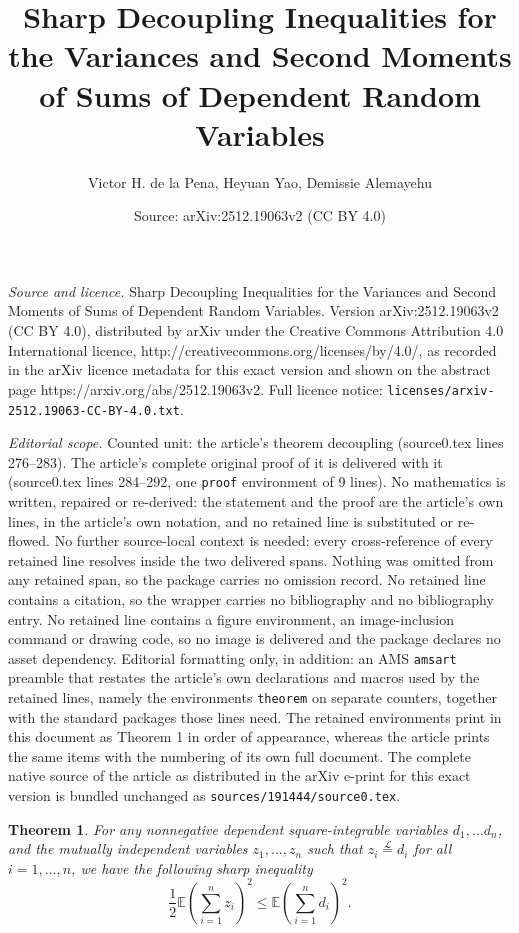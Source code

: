 \documentclass[10pt,a4paper]{amsart}
\title{Sharp Decoupling Inequalities for the Variances and Second Moments of Sums of Dependent Random Variables}
\author{Victor H. de la Pena, Heyuan Yao, Demissie Alemayehu}
\date{Source: arXiv:2512.19063v2 (CC BY 4.0)}
\newtheorem{theorem}{Theorem}
\newcommand{\E}{\mathbb{E}}
\newcommand{\lpar}{\left(}
\newcommand{\rpar}{\right)}
\newcommand{\sumn}{\sum\limits_{i=1}^n}
\begin{document}
\maketitle

\noindent\emph{Source and licence.} Sharp Decoupling Inequalities for the Variances and Second Moments of Sums of Dependent Random Variables. Version arXiv:2512.19063v2 (CC BY 4.0), distributed by arXiv under the Creative Commons Attribution 4.0 International licence, http://creativecommons.org/licenses/by/4.0/, as recorded in the arXiv licence metadata for this exact version and shown on the abstract page https://arxiv.org/abs/2512.19063v2. Full licence notice: \texttt{licenses/arxiv-2512.19063-CC-BY-4.0.txt}.\par\smallskip

\noindent\textit{Editorial scope.} Counted unit: the article's theorem decoupling (source0.tex lines 276--283). The article's complete original proof of it is delivered with it (source0.tex lines 284--292, one \texttt{proof} environment of 9 lines). No mathematics is written, repaired or re-derived: the statement and the proof are the article's own lines, in the article's own notation, and no retained line is substituted or re-flowed.  No further source-local context is needed: every cross-reference of every retained line resolves inside the two delivered spans.  Nothing was omitted from any retained span, so the package carries no omission record.  No retained line contains a citation, so the wrapper carries no bibliography and no bibliography entry.  No retained line contains a figure environment, an image-inclusion command or drawing code, so no image is delivered and the package declares no asset dependency.  Editorial formatting only, in addition: an AMS \texttt{amsart} preamble that restates the article's own declarations and macros used by the retained lines, namely the environments \texttt{theorem} on separate counters, together with the standard packages those lines need.  The retained environments print in this document as Theorem 1 in order of appearance, whereas the article prints the same items with the numbering of its own full document.  The complete native source of the article as distributed in the arXiv e-print for this exact version is bundled unchanged as \texttt{sources/191444/source0.tex}.
\begin{theorem}
    \label{thm: complete decoupling}
    For any nonnegative dependent square-integrable  variables $d_1,...d_n$, and the mutually independent  variables $z_1,...,z_n$ such that $z_i \stackrel{\mathcal{L}}{=} d_i$ for all $i=1,...,n$, we have the following sharp inequality
    \begin{equation}
        \label{equ: complete decoupling}
        \frac{1}{2}\E\lpar\sumn z_i\rpar^2 \leq \E \lpar \sumn d_i\rpar^2.
    \end{equation}
\end{theorem}
\end{document}
